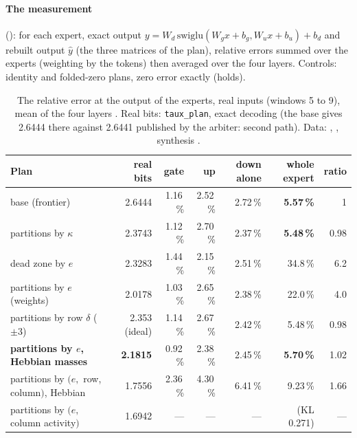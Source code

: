 \paragraph{The measurement} (): for each expert, exact output $y = W_d\,\mathrm{swiglu}(W_g x + b_g, W_u x + b_u) + b_d$ and rebuilt output $\hat y$ (the three matrices of the plan), relative errors summed over the experts (weighting by the tokens) then averaged over the four layers. Controls: identity and folded-zero plans, zero error exactly (holds).

\begin{table}[tbp]
\centering\footnotesize\setlength{\tabcolsep}{3pt}
\begin{tabularx}{\linewidth}{@{}>{\raggedright\arraybackslash}X r r r r r r@{}}
\toprule
Plan & real bits & gate & up & down alone & \textbf{whole expert} & ratio \\
\midrule
base (frontier) & 2.6444 & 1.16\,\% & 2.52\,\% & 2.72\,\% & \textbf{5.57\,\%} & 1 \\
partitions by $\kappa$ & 2.3743 & 1.12\,\% & 2.70\,\% & 2.37\,\% & \textbf{5.48\,\%} & 0.98 \\
dead zone by $e$ & 2.3283 & 1.44\,\% & 2.15\,\% & 2.51\,\% & 34.8\,\% & 6.2 \\
partitions by $e$ (weights) & 2.0178 & 1.03\,\% & 2.65\,\% & 2.38\,\% & 22.0\,\% & 4.0 \\
partitions by row $\delta$ ($\pm3$) & 2.353 (ideal) & 1.14\,\% & 2.67\,\% & 2.42\,\% & 5.48\,\% & 0.98 \\
\textbf{partitions by $e$, Hebbian masses} & \textbf{2.1815} & 0.92\,\% & 2.38\,\% & 2.45\,\% & \textbf{5.70\,\%} & 1.02 \\
partitions by $(e,$ row, column$)$, Hebbian & 1.7556 & 2.36\,\% & 4.30\,\% & 6.41\,\% & 9.23\,\% & 1.66 \\
partitions by $(e,$ column activity$)$ & 1.6942 & --- & --- & --- & (KL 0.271) & --- \\
\bottomrule
\end{tabularx}
\caption[The error at the output of the experts]{The relative error at the output of the experts, real inputs (windows 5 to 9), mean of the four layers \mes. Real bits: \texttt{taux\_plan}, exact decoding (the base gives 2.6444 there against 2.6441 published by the arbiter: second path). Data: , , synthesis .}
\label{t3pre:tab:sortie}
\end{table}

